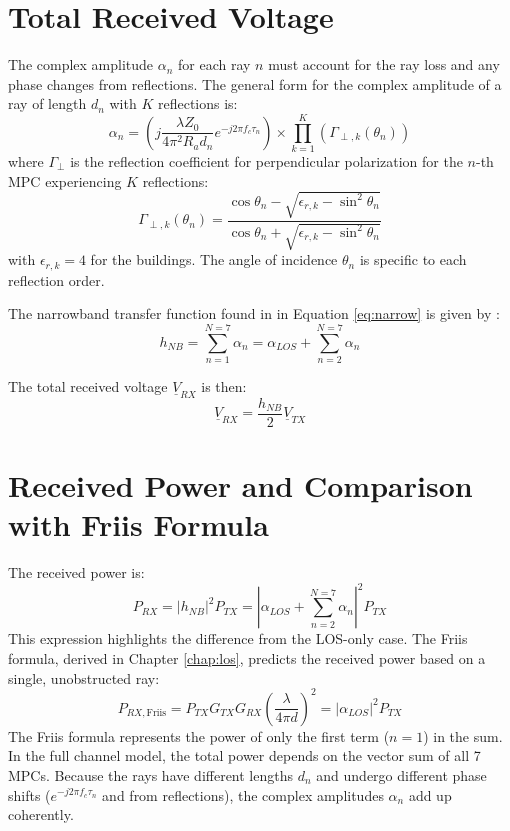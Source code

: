 \section{Total Received Voltage}
The complex amplitude $\alpha_n$ for each ray $n$ must account for the ray loss and any phase changes from reflections. The general form for the complex amplitude of a ray of length $d_n$ with $K$ reflections is:
\begin{equation}
	\alpha_n = \left( j \frac{\lambda Z_0}{4\pi^2 R_a d_n} e^{-j2\pi f_c \tau_n} \right) \times \prod_{k=1}^{K}(\Gamma_{\perp, k}(\theta_{n}))
\end{equation}
where $\Gamma_{\perp}$ is the reflection coefficient for perpendicular polarization for the $n$-th MPC experiencing $K$ reflections:
\begin{equation}
	\Gamma_{\perp, k}(\theta_n) = \frac{\cos\theta_n - \sqrt{\epsilon_{r, k} - \sin^2\theta_n}}{\cos\theta_n + \sqrt{\epsilon_{r, k} - \sin^2\theta_n}}
\end{equation}
with $\epsilon_{r,k} = 4$ for the buildings. The angle of incidence $\theta_n$ is specific to each reflection order.

The narrowband transfer function found in in Equation \eqref{eq:narrow} is given by :
\begin{equation}
	h_{NB} = \sum_{n=1}^{N=7} \alpha_n = \alpha_{LOS} + \sum_{n=2}^{N=7} \alpha_n
\end{equation}

The total received voltage $\underline{V}_{RX}$ is then:
\begin{equation}
	\underline{V}_{RX} = \frac{h_{NB}}{2} \underline{V}_{TX}
\end{equation}

\section{Received Power and Comparison with Friis Formula}

The received power is:
\begin{equation}
	P_{RX} = |h_{NB}|^2 P_{TX} = \left| \alpha_{LOS} + \sum_{n=2}^{N=7} \alpha_n \right|^2 P_{TX}
\end{equation}
This expression highlights the difference from the LOS-only case. The Friis formula, derived in Chapter \ref{chap:los}, predicts the received power based on a single, unobstructed ray:
\begin{equation}
	P_{RX, \text{Friis}} = P_{TX} G_{TX} G_{RX} \left( \frac{\lambda}{4\pi d} \right)^2 = |\alpha_{LOS}|^2 P_{TX}
\end{equation}
The Friis formula represents the power of only the first term ($n=1$) in the sum. In the full channel model, the total power depends on the vector sum of all 7 MPCs. Because the rays have different lengths $d_n$ and undergo different phase shifts ($e^{-j2\pi f_c \tau_n}$ and from reflections), the complex amplitudes $\alpha_n$ add up coherently.

